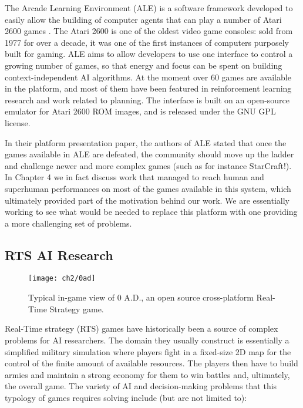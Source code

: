 The Arcade Learning Environment (ALE) is a software framework developed to
easily allow the building of computer agents that can play a number of Atari
2600 games \citep{bellemare2012arcade}. The Atari 2600 is one of the oldest
video game consoles: sold from 1977 for over a decade, it was one of the first
instances of computers purposely built for gaming. ALE aims to allow developers
to use one interface to control a growing number of games, so that energy and
focus can be spent on building context-independent AI algorithms. At the moment
over 60 games are available in the platform, and most of them have been featured
in reinforcement learning research and work related to planning. The interface
is built on an open-source emulator for Atari 2600 ROM images, and is released
under the GNU GPL license.

In their platform presentation paper, the authors of ALE stated that once the
games available in ALE are defeated, the community should move up the ladder and
challenge newer and more complex games (such as for instance StarCraft!). In
Chapter 4 we in fact discuss work that managed to reach human and superhuman
performances on most of the games available in this system, which ultimately
provided part of the motivation behind our work. We are essentially working to
see what would be needed to replace this platform with one providing a more
challenging set of problems.

\subsection{RTS AI Research}

\begin{figure}[h]
    \centering
    \texttt{[image: ch2/0ad]}
    \caption{Typical in-game view of 0 A.D., an open source cross-platform
      Real-Time Strategy game.}
    \label{fig:0ad}
\end{figure}

Real-Time strategy (RTS) games have historically been a source of complex
problems for AI researchers. The domain they usually construct is essentially a
simplified military simulation where players fight in a fixed-size 2D map for
the control of the finite amount of available resources. The players then have
to build armies and maintain a strong economy for them to win battles and,
ultimately, the overall game. The variety of AI and decision-making problems
that this typology of games requires solving include (but are not limited to):

